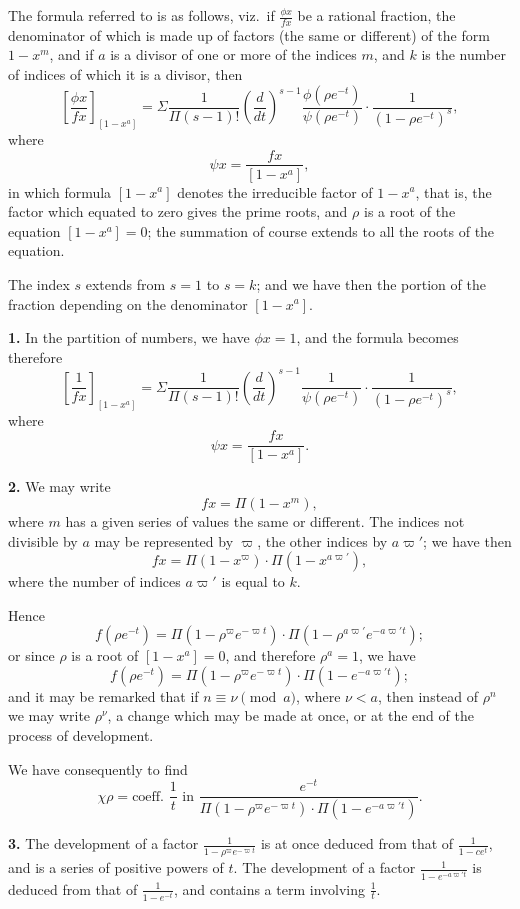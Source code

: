 \documentclass[11pt,a4paper]{book}
\begin{document}
\begin{center}
The formula referred to is as follows, viz.\ if $\frac{\phi x}{fx}$ be a rational fraction, the denominator of which is made up of factors (the same or different) of the form $1-x^m$, and if $a$ is a divisor of one or more of the indices $m$, and $k$ is the number of indices of which it is a divisor, then
\[
\left[\frac{\phi x}{fx}\right]_{[1-x^a]}
= \Sigma \frac{1}{\Pi(s-1)!} \left(\frac{d}{dt}\right)^{s-1} \frac{\phi(\rho e^{-t})}{\psi(\rho e^{-t})} \cdot \frac{1}{(1-\rho e^{-t})^s},
\]
where
\[\psi x = \frac{fx}{[1-x^a]},\]
in which formula $[1-x^a]$ denotes the irreducible factor of $1-x^a$, that is, the factor which equated to zero gives the prime roots, and $\rho$ is a root of the equation $[1-x^a]=0$; the summation of course extends to all the roots of the equation.

The index $s$ extends from $s=1$ to $s=k$; and we have then the portion of the fraction depending on the denominator $[1-x^a]$.

\medskip
\noindent\textbf{1.} In the partition of numbers, we have $\phi x = 1$, and the formula becomes therefore
\[
\left[\frac{1}{fx}\right]_{[1-x^a]} = \Sigma \frac{1}{\Pi(s-1)!} \left(\frac{d}{dt}\right)^{s-1} \frac{1}{\psi(\rho e^{-t})} \cdot \frac{1}{(1-\rho e^{-t})^s},
\]
where
\[\psi x = \frac{fx}{[1-x^a]}.\]

\medskip
\noindent\textbf{2.} We may write
\[fx = \Pi(1-x^m),\]
where $m$ has a given series of values the same or different. The indices not divisible by $a$ may be represented by $\varpi$, the other indices by $a\varpi'$; we have then
\[fx = \Pi(1-x^{\varpi}) \cdot \Pi(1-x^{a\varpi'}),\]
where the number of indices $a\varpi'$ is equal to $k$.

Hence
\[f(\rho e^{-t}) = \Pi(1-\rho^{\varpi}e^{-\varpi t}) \cdot \Pi(1-\rho^{a\varpi'}e^{-a\varpi' t});\]
or since $\rho$ is a root of $[1-x^a]=0$, and therefore $\rho^a=1$, we have
\[f(\rho e^{-t}) = \Pi(1-\rho^{\varpi}e^{-\varpi t}) \cdot \Pi(1-e^{-a\varpi' t});\]
and it may be remarked that if $n \equiv \nu \pmod{a}$, where $\nu < a$, then instead of $\rho^n$ we may write $\rho^{\nu}$, a change which may be made at once, or at the end of the process of development.

We have consequently to find
\[\chi \rho = \text{coeff. } \frac{1}{t} \text{ in } \frac{e^{-t}}{\Pi(1-\rho^{\varpi}e^{-\varpi t}) \cdot \Pi(1-e^{-a\varpi' t})}.\]

\newpage

\medskip
\noindent\textbf{3.} The development of a factor $\frac{1}{1-\rho^{\varpi}e^{-\varpi t}}$ is at once deduced from that of $\frac{1}{1-ce^t}$, and is a series of positive powers of $t$. The development of a factor $\frac{1}{1-e^{-a\varpi' t}}$ is deduced from that of $\frac{1}{1-e^{-t}}$, and contains a term involving $\frac{1}{t}$.


\end{center}
\end{document}
